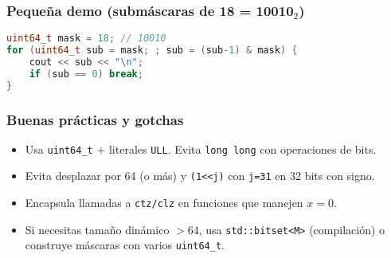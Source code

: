 \subsubsection*{Pequeña demo (submáscaras de 18 = 10010$_2$)}
\begin{lstlisting}[language=C++]
uint64_t mask = 18; // 10010
for (uint64_t sub = mask; ; sub = (sub-1) & mask) {
    cout << sub << "\n";
    if (sub == 0) break;
}
\end{lstlisting}

\subsubsection*{Buenas prácticas y gotchas}
\begin{itemize}
  \item Usa \texttt{uint64\_t} + literales \texttt{ULL}. Evita \texttt{long long} con operaciones de bits.
  \item Evita desplazar por 64 (o más) y \texttt{(1<<j)} con \texttt{j=31} en 32 bits con signo.
  \item Encapsula llamadas a \texttt{ctz/clz} en funciones que manejen $x=0$.
  \item Si necesitas tamaño dinámico $>64$, usa \texttt{std::bitset<M>} (compilación) o construye máscaras con varios \texttt{uint64\_t}.
\end{itemize}
